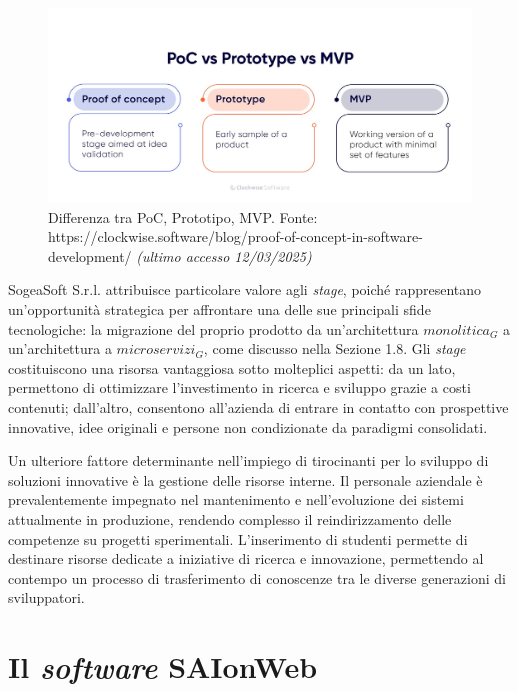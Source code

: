     \begin{figure}[H]
        \centering
        \includegraphics[width=0.6\linewidth]{BCS-Tessi/images/PoC_MVP.jpeg}
        \caption[Differenza tra PoC, Prototipo, MVP]{Differenza tra PoC, Prototipo, MVP. Fonte: https://clockwise.software/blog/proof-of-concept-in-software-development/ \textit{(ultimo accesso 12/03/2025)}}
        \label{fig:PoC-prototipo-MVP}
    \end{figure}

    \vspace{0.2 em}
    \noindent SogeaSoft S.r.l. attribuisce particolare valore agli \textit{stage}, poiché rappresentano un'opportunità strategica per affrontare una delle sue principali sfide tecnologiche: la migrazione del proprio prodotto da un’architettura $monolitica_G$ a un’architettura a $microservizi_G$, come discusso nella Sezione 1.8. Gli \textit{stage} costituiscono una risorsa vantaggiosa sotto molteplici aspetti: da un lato, permettono di ottimizzare l’investimento in ricerca e sviluppo grazie a costi contenuti; dall’altro, consentono all’azienda di entrare in contatto con prospettive innovative, idee originali e persone non condizionate da paradigmi consolidati. 

    \vspace{0.2 em}
    \noindent Un ulteriore fattore determinante nell’impiego di tirocinanti per lo sviluppo di soluzioni innovative è la gestione delle risorse interne. Il personale aziendale è prevalentemente impegnato nel mantenimento e nell’evoluzione dei sistemi attualmente in produzione, rendendo complesso il reindirizzamento delle competenze su progetti sperimentali. L’inserimento di studenti permette di destinare risorse dedicate a iniziative di ricerca e innovazione, permettendo al contempo un processo di trasferimento di conoscenze tra le diverse generazioni di sviluppatori.
    
    \section{Il \textit{software} SAIonWeb}
    
